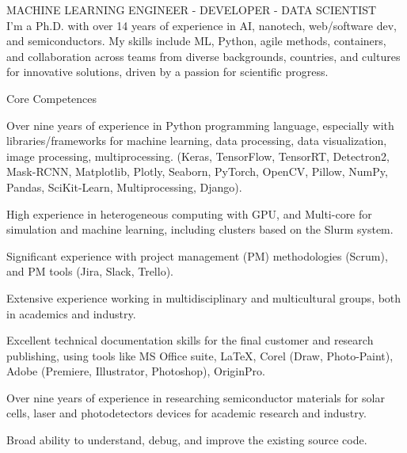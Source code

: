 \documentclass{resume} %
\begin{document}
    \begin{rSection}{}
        \begin{center}
            MACHINE LEARNING ENGINEER - DEVELOPER - DATA SCIENTIST\\ \vspace*{0.3cm}
            {\normalfont 
            {\scriptsize I'm a Ph.D. with over 14 years of experience in AI, nanotech, web/software dev, and semiconductors. My skills include ML, Python, agile methods, containers, and collaboration across teams from diverse backgrounds, countries, and cultures for innovative solutions, driven by a passion for scientific progress.}
            }
        \end{center}
    \end{rSection}
    
    \begin{rSection}{}
    \end{rSection}
    
    \begin{rSection}{Core Competences}
        \begin{rSubsection}{}{}{}{}
            \item {\normalfont Over nine years of experience in Python programming language, especially with libraries/frameworks for machine learning, data processing, data visualization, image processing, multiprocessing. (Keras, TensorFlow, TensorRT, Detectron2, Mask-RCNN, Matplotlib, Plotly, Seaborn, PyTorch, OpenCV, Pillow, NumPy, Pandas, SciKit-Learn, Multiprocessing, Django).}
            \item {\normalfont High experience in heterogeneous computing with GPU, and Multi-core for simulation and machine learning, including clusters based on the Slurm system.}
            \item {\normalfont Significant experience with project management (PM) methodologies (Scrum), and PM tools (Jira, Slack, Trello).}
            \item {\normalfont Extensive experience working in multidisciplinary and multicultural groups, both in academics and industry.}
            \item {\normalfont Excellent technical documentation skills for the final customer and research publishing, using tools like MS Office suite, \LaTeX, Corel (Draw, Photo-Paint), Adobe (Premiere, Illustrator, Photoshop), OriginPro.}
            \item {\normalfont Over nine years of experience in researching semiconductor materials for solar cells, laser and photodetectors devices for academic research and industry.}
            \item {\normalfont Broad ability to understand, debug, and improve the existing source code.}
        \end{rSubsection}
    \end{rSection}
    
\end{document}
